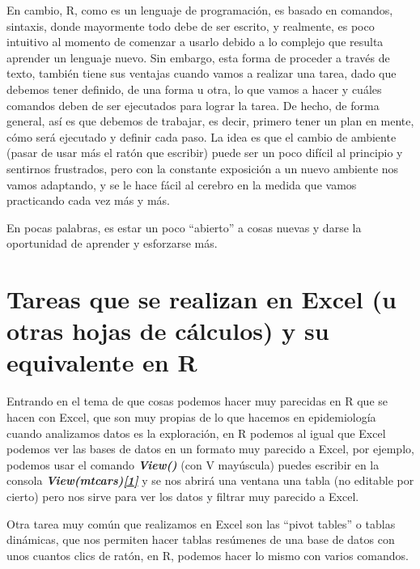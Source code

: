 \documentclass[
  letterpaper,
  DIV=11,
  numbers=noendperiod]{scrreprt}
\begin{document}
En cambio, R, como es un lenguaje de programación, es basado en
comandos, sintaxis, donde mayormente todo debe de ser escrito, y
realmente, es poco intuitivo al momento de comenzar a usarlo debido a lo
complejo que resulta aprender un lenguaje nuevo. Sin embargo, esta forma
de proceder a través de texto, también tiene sus ventajas cuando vamos a
realizar una tarea, dado que debemos tener definido, de una forma u
otra, lo que vamos a hacer y cuáles comandos deben de ser ejecutados
para lograr la tarea. De hecho, de forma general, así es que debemos de
trabajar, es decir, primero tener un plan en mente, cómo será ejecutado
y definir cada paso. La idea es que el cambio de ambiente (pasar de usar
más el ratón que escribir) puede ser un poco difícil al principio y
sentirnos frustrados, pero con la constante exposición a un nuevo
ambiente nos vamos adaptando, y se le hace fácil al cerebro en la medida
que vamos practicando cada vez más y más.

En pocas palabras, es estar un poco ``abierto'' a cosas nuevas y darse
la oportunidad de aprender y esforzarse más.

\section{Tareas que se realizan en Excel (u otras hojas de cálculos) y
su equivalente en
R}\label{tareas-que-se-realizan-en-excel-u-otras-hojas-de-cuxe1lculos-y-su-equivalente-en-r}

Entrando en el tema de que cosas podemos hacer muy parecidas en R que se
hacen con Excel, que son muy propias de lo que hacemos en epidemiología
cuando analizamos datos es la exploración, en R podemos al igual que
Excel podemos ver las bases de datos en un formato muy parecido a Excel,
por ejemplo, podemos usar el comando \textbf{\emph{View()}} (con V
mayúscula) puedes escribir en la consola
\textbf{\emph{View(mtcars)\hyperref[_ftn1]{{[}1{]}}}} y se nos abrirá
una ventana una tabla (no editable por cierto) pero nos sirve para ver
los datos y filtrar muy parecido a Excel.

Otra tarea muy común que realizamos en Excel son las ``pivot tables'' o
tablas dinámicas, que nos permiten hacer tablas resúmenes de una base de
datos con unos cuantos clics de ratón, en R, podemos hacer lo mismo con
varios comandos.
\end{document}
